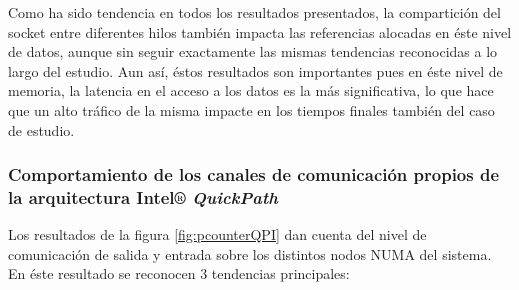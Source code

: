 Como ha sido tendencia en todos los resultados presentados, la compartición del socket entre diferentes hilos también impacta las referencias alocadas en éste nivel de datos, aunque sin seguir exactamente las mismas tendencias reconocidas a lo largo del estudio. Aun así, éstos resultados son importantes pues en éste nivel de memoria, la latencia en el acceso a los datos es la más significativa, lo que hace que un alto tráfico de la misma impacte en los tiempos finales también del caso de estudio.

\subsubsection{Comportamiento de los canales de comunicación propios de la arquitectura Intel® \emph{QuickPath}}

Los resultados de la figura \ref{fig:pcounterQPI} dan cuenta del nivel de comunicación de salida y entrada sobre los distintos nodos NUMA del sistema. En éste resultado se reconocen 3 tendencias principales:
